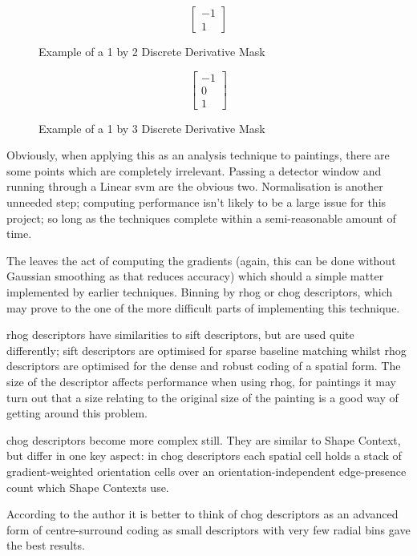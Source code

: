 \begin{figure}[h]
$$
\begin{bmatrix}
-1 \\
1
\end{bmatrix}
$$
\caption{Example of a 1 by 2 Discrete Derivative Mask} \label{fig:1x2-ddm}
\end{figure}

\begin{figure}[h]
$$
\begin{bmatrix}
-1 \\
0 \\
1
\end{bmatrix}
$$
\caption{Example of a 1 by 3 Discrete Derivative Mask} \label{fig:1x3-ddm}
\end{figure}

Obviously, when applying this as an analysis technique to paintings, there are some points which
are completely irrelevant. Passing a detector window and running through a Linear \gls{svm} are
the obvious two. Normalisation is another unneeded step; computing performance isn't likely to be
a large issue for this project; so long as the techniques complete within a semi-reasonable amount
of time.

The leaves the act of computing the gradients (again, this can be done without Gaussian smoothing
as that reduces accuracy) which should a simple matter implemented by earlier techniques. Binning 
by \gls{rhog} or \gls{chog} descriptors, which may prove to the one of the more difficult parts of
implementing this technique.

\Gls{rhog} descriptors have similarities to \gls{sift} descriptors, but are used quite 
differently; \gls{sift} descriptors are optimised for sparse baseline matching whilst \gls{rhog}
descriptors are optimised for the dense and robust coding of a spatial form. The size of the
descriptor affects performance when using \gls{rhog}, for paintings it may turn out that a size
relating to the original size of the painting is a good way of getting around this problem.

\Gls{chog} descriptors become more complex still. They are similar to Shape 
Context\cite{ Belongie2001Matching}, but differ in one key aspect: in \gls{chog} descriptors each
spatial cell holds a stack of gradient-weighted orientation cells over an orientation-independent
edge-presence count which Shape Contexts use.

According to the author it is better to think of \gls{chog} descriptors as an advanced form of 
centre-surround coding as small descriptors with very few radial bins gave the best results.

